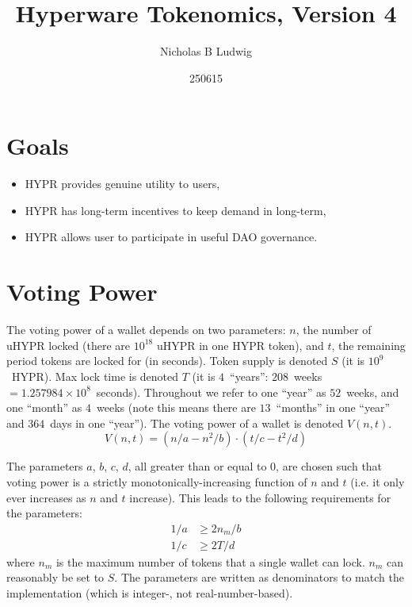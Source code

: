 \documentclass{article}
\title{Hyperware Tokenomics, Version 4}
\date{250615}
\author{Nicholas B Ludwig}
\begin{document}
\maketitle

\section{Goals}\label{sec:goals}
\begin{itemize}
    \item HYPR provides genuine utility to users,
    \item HYPR has long-term incentives to keep demand in long-term,
    \item HYPR allows user to participate in useful DAO governance.
\end{itemize}

\section{Voting Power}\label{sec:votingpower}

The voting power of a wallet depends on two parameters: $n$, the number of uHYPR locked (there are $10^{18}$ uHYPR in one HYPR token), and $t$, the remaining period tokens are locked for (in seconds).
Token supply is denoted $S$ (it is $10^9$~HYPR).
Max lock time is denoted $T$ (it is $4$~``years'': $208$~weeks $= 1.257984\times 10^8$~seconds).
Throughout we refer to one ``year'' as $52$~weeks, and one ``month'' as $4$~weeks (note this means there are $13$~``months'' in one ``year'' and $364$~days in one ``year'').
The voting power of a wallet is denoted $V(n, t)$.
\begin{equation}
V(n, t) = (n/a - n^2/b) \cdot (t/c - t^2/d)
\end{equation}

The parameters $a$, $b$, $c$, $d$, all greater than or equal to $0$, are chosen such that voting power is a strictly monotonically-increasing function of $n$ and $t$ (i.e. it only ever increases as $n$ and $t$ increase).
This leads to the following requirements for the parameters:
\begin{equation}\label{eq:parameters-extremum}
\begin{aligned}
1/a &\geq 2 n_m / b\\
1/c &\geq 2 T / d
\end{aligned}
\end{equation}
where $n_m$ is the maximum number of tokens that a single wallet can lock.
$n_m$ can reasonably be set to $S$.
The parameters are written as denominators to match the implementation (which is integer-, not real-number-based).
\end{document}
